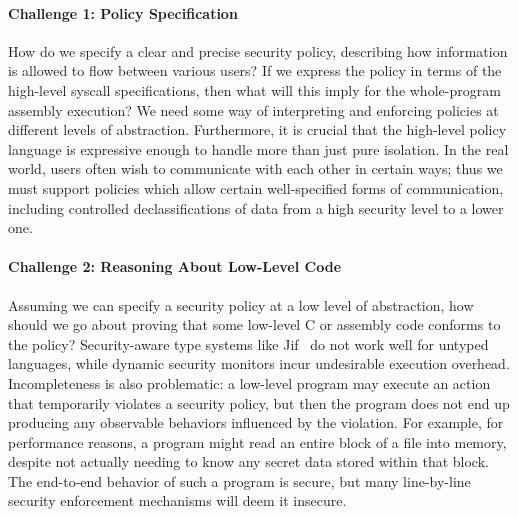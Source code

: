 \paragraph{Challenge 1: Policy Specification}
How do we specify a clear
and precise security policy, describing how information is
allowed to flow between various users? If we express the
policy in terms of the high-level syscall specifications, 
then what will this imply for the whole-program assembly execution? 
We need some way of interpreting and enforcing policies at different 
levels of abstraction. Furthermore, it is crucial that the
high-level policy language is expressive enough to handle more
than just pure isolation. In the real world, users often wish to
communicate with each other in certain ways; thus we must support
policies which allow certain well-specified forms of 
communication, including controlled declassifications of 
data from a high security level to a lower one.

\paragraph{Challenge 2: Reasoning About Low-Level Code}
Assuming we can specify a security policy at a low level of
abstraction, how should we go about proving that some low-level
C or assembly code conforms to the policy? Security-aware type
systems like Jif~\cite{jif} do not work well for untyped
languages, while dynamic security monitors incur undesirable execution 
overhead. Incompleteness is also problematic: a low-level program
may execute an action that temporarily violates a security policy, 
but then the program does not end up producing any observable
behaviors influenced by the violation. For example, for performance
reasons, a program might read an entire block of a file into memory,
despite not actually needing to know any secret 
data stored within that block. The end-to-end behavior of such a 
program is secure, but many line-by-line security enforcement
mechanisms will deem it insecure.


